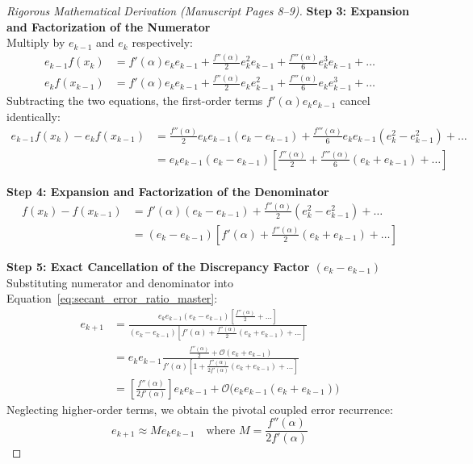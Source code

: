\begin{proof}[Rigorous Mathematical Derivation (Manuscript Pages 8--9)]
\noindent\textbf{Step 3: Expansion and Factorization of the Numerator} \\
Multiply by $e_{k-1}$ and $e_k$ respectively:
\begin{align}
    e_{k-1} f(x_k) &= f'(\alpha) e_k e_{k-1} + \frac{f''(\alpha)}{2} e_k^2 e_{k-1} + \frac{f'''(\alpha)}{6} e_k^3 e_{k-1} + \dots \\
    e_k f(x_{k-1}) &= f'(\alpha) e_k e_{k-1} + \frac{f''(\alpha)}{2} e_k e_{k-1}^2 + \frac{f'''(\alpha)}{6} e_k e_{k-1}^3 + \dots
\end{align}
Subtracting the two equations, the first-order terms $f'(\alpha) e_k e_{k-1}$ cancel identically:
\begin{align}
    e_{k-1} f(x_k) - e_k f(x_{k-1}) &= \frac{f''(\alpha)}{2} e_k e_{k-1}(e_k - e_{k-1}) + \frac{f'''(\alpha)}{6} e_k e_{k-1}(e_k^2 - e_{k-1}^2) + \dots \nonumber \\
    &= e_k e_{k-1}(e_k - e_{k-1}) \left[ \frac{f''(\alpha)}{2} + \frac{f'''(\alpha)}{6}(e_k + e_{k-1}) + \dots \right]
\end{align}

\noindent\textbf{Step 4: Expansion and Factorization of the Denominator}
\begin{align}
    f(x_k) - f(x_{k-1}) &= f'(\alpha)(e_k - e_{k-1}) + \frac{f''(\alpha)}{2}(e_k^2 - e_{k-1}^2) + \dots \nonumber \\
    &= (e_k - e_{k-1}) \left[ f'(\alpha) + \frac{f''(\alpha)}{2}(e_k + e_{k-1}) + \dots \right]
\end{align}

\noindent\textbf{Step 5: Exact Cancellation of the Discrepancy Factor $(e_k - e_{k-1})$} \\
Substituting numerator and denominator into Equation~\eqref{eq:secant_error_ratio_master}:
\begin{align}
    e_{k+1} &= \frac{e_k e_{k-1}(e_k - e_{k-1}) \left[ \frac{f''(\alpha)}{2} + \dots \right]}{(e_k - e_{k-1}) \left[ f'(\alpha) + \frac{f''(\alpha)}{2}(e_k + e_{k-1}) + \dots \right]} \nonumber \\
    &= e_k e_{k-1} \frac{\frac{f''(\alpha)}{2} + \mathcal{O}(e_k + e_{k-1})}{f'(\alpha) \left[ 1 + \frac{f''(\alpha)}{2 f'(\alpha)}(e_k + e_{k-1}) + \dots \right]} \nonumber \\
    &= \left[ \frac{f''(\alpha)}{2 f'(\alpha)} \right] e_k e_{k-1} + \mathcal{O}\big(e_k e_{k-1}(e_k + e_{k-1})\big)
\end{align}
Neglecting higher-order terms, we obtain the pivotal coupled error recurrence:
\begin{equation}
    \label{eq:secant_asymptotic_recurrence_explicit}
    \boxed{e_{k+1} \approx M e_k e_{k-1}} \quad \text{where } M = \frac{f''(\alpha)}{2 f'(\alpha)}
\end{equation}


\end{proof}
